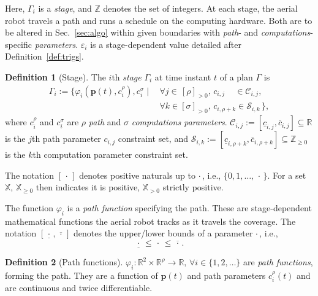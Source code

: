 \documentclass[letterpaper,10pt,journal,twoside]{IEEEtran}
\theoremstyle{definition}
\newtheorem{defn}{Definition}[section]
\begin{document}
Here, $\Gamma_i$ is a \emph{stage}, and $\mathbb{Z}$ denotes the set of integers. At each stage, the aerial robot travels a path and runs a schedule on the computing hardware. Both are to be altered in Sec.~\ref{sec:algo} within given boundaries with \emph{path}- and \emph{computations}-specific \emph{parameters}. $\varepsilon_i$ is a stage-dependent value detailed %
after Definition~\ref{def:trigs}.

\begin{defn}[Stage]\label{def:stage}
  The $i$th \emph{stage} $\Gamma_i$ at time instant $t$ of a plan $\Gamma$ is
  \begin{equation*}\begin{split}
    \Gamma_i:=\{\varphi_i(\mathbf{p}(t),c_i^\rho),c_i^\sigma\mid
    \,&\forall j\in\,[\rho]_{>0},\,c_{i,j}\,\,\,\,\,\,\,\in\mathcal{C}_{i,j},\,\\
      &\forall k\in[\sigma]_{>0},\,c_{i,\rho+k}\in\mathcal{S}_{i,k}\,\},
  \end{split}\end{equation*}
  where $c_i^\rho$ and $c_i^\sigma$ are $\rho$ \emph{path} and $\sigma$ \emph{computations parameters}. $\mathcal{C}_{i,j}:=[\underline{c}_{i,j},\overline{c}_{i,j}]\subseteq\mathbb{R}$ is the $j$th path parameter $c_{i,j}$ constraint set, and $\mathcal{S}_{i,k}:=[\underline{c}_{i,\rho+k},\overline{c}_{i,\rho+k}]\subseteq\mathbb{Z}_{\geq 0}$ is the $k$th computation parameter constraint set.
\end{defn}

The notation $[\,\cdot\,]$ denotes positive naturals up to $\cdot$\,, i.e., $\{0,1,\dots,\,\cdot\,\}$.
For a set $\mathbb{X}$, $\mathbb{X}_{\geq 0}$ then indicates it is positive, $\mathbb{X}_{> 0}$ strictly positive.

The function $\varphi_i$ is a \emph{path function} specifying the path. These are stage-dependent mathematical functions the aerial robot tracks as it travels %
the coverage. The notation $[\underline{\,\cdot\,},\overline{\,\cdot\,}]$ denotes the upper/lower bounds of a parameter $\cdot\,$, i.e.,
\begin{equation}
  \underline{\,\cdot\,}\leq\,\cdot\,\leq\overline{\,\cdot\,}.
\end{equation}

\begin{defn}[Path functions]
  \label{def:paths}
  $\varphi_i:\mathbb{R}^2\times\mathbb{R}^\rho\rightarrow\mathbb{R},\,\forall i\in\{1,2,\dots\}
  $ are \emph{path functions}, forming the path. They are a function of $\mathbf{p}(t)$ and path parameters $c_i^\rho(t)$ and are continuous and twice differentiable.
\end{defn}
\end{document}
